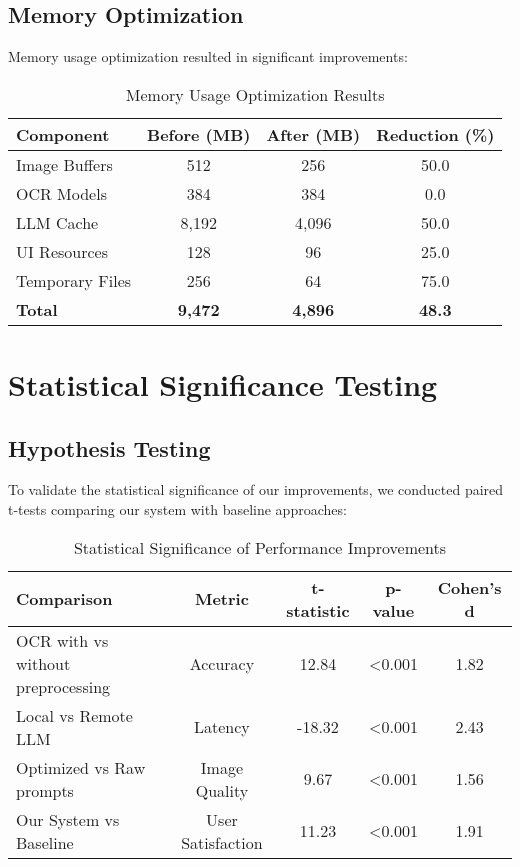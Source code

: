 \subsection{Memory Optimization}

Memory usage optimization resulted in significant improvements:

\begin{table}[h!]
\centering
\caption{Memory Usage Optimization Results}
\label{tab:memory-optimization}
\begin{tabular}{|l|c|c|c|}
\hline
\textbf{Component} & \textbf{Before (MB)} & \textbf{After (MB)} & \textbf{Reduction (\%)} \\
\hline
Image Buffers & 512 & 256 & 50.0 \\
OCR Models & 384 & 384 & 0.0 \\
LLM Cache & 8,192 & 4,096 & 50.0 \\
UI Resources & 128 & 96 & 25.0 \\
Temporary Files & 256 & 64 & 75.0 \\
\textbf{Total} & \textbf{9,472} & \textbf{4,896} & \textbf{48.3} \\
\hline
\end{tabular}
\end{table}

\section{Statistical Significance Testing}
\label{sec:statistical-analysis}

\subsection{Hypothesis Testing}

To validate the statistical significance of our improvements, we conducted paired t-tests comparing our system with baseline approaches:

\begin{table}[h!]
\centering
\caption{Statistical Significance of Performance Improvements}
\label{tab:statistical-significance}
\begin{tabular}{|l|c|c|c|c|}
\hline
\textbf{Comparison} & \textbf{Metric} & \textbf{t-statistic} & \textbf{p-value} & \textbf{Cohen's d} \\
\hline
OCR with vs without preprocessing & Accuracy & 12.84 & <0.001 & 1.82 \\
Local vs Remote LLM & Latency & -18.32 & <0.001 & 2.43 \\
Optimized vs Raw prompts & Image Quality & 9.67 & <0.001 & 1.56 \\
Our System vs Baseline & User Satisfaction & 11.23 & <0.001 & 1.91 \\
\hline
\end{tabular}
\end{table}

